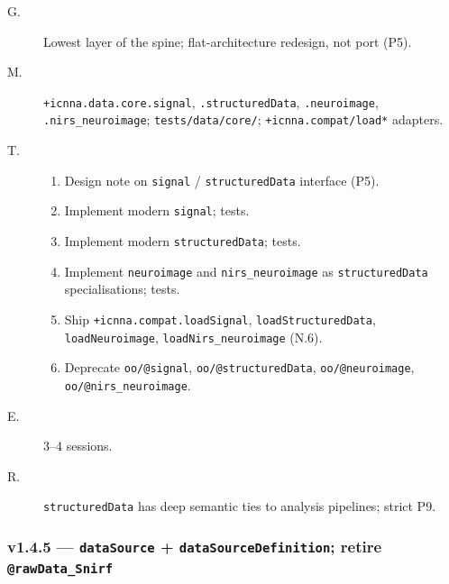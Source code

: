 \documentclass[11pt,a4paper]{article}
\begin{document}
\begin{description}
    \item[G.] Lowest layer of the spine; flat-architecture redesign, not port (P5).
    \item[M.] \texttt{+icnna.data.core.signal}, \texttt{.structuredData}, \texttt{.neuroimage}, \texttt{.nirs\_neuroimage}; \texttt{tests/data/core/}; \texttt{+icnna.compat/load*} adapters.
    \item[T.]
        \begin{enumerate}[nosep]
            \item Design note on \texttt{signal} / \texttt{structuredData} interface (P5).
            \item Implement modern \texttt{signal}; tests.
            \item Implement modern \texttt{structuredData}; tests.
            \item Implement \texttt{neuroimage} and \texttt{nirs\_neuroimage} as \texttt{structuredData} specialisations; tests.
            \item Ship \texttt{+icnna.compat.loadSignal}, \texttt{loadStructuredData}, \texttt{loadNeuroimage}, \texttt{loadNirs\_neuroimage} (N.6).
            \item Deprecate \texttt{oo/@signal}, \texttt{oo/@structuredData}, \texttt{oo/@neuroimage}, \texttt{oo/@nirs\_neuroimage}.
        \end{enumerate}
    \item[E.] 3--4 sessions.
    \item[R.] \texttt{structuredData} has deep semantic ties to analysis pipelines; strict P9.
\end{description}

\subsubsection*{v1.4.5 --- \texttt{dataSource} + \texttt{dataSourceDefinition}; retire \texttt{@rawData\_Snirf}}
\end{document}
